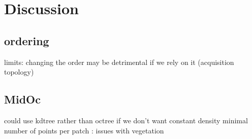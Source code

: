 

 \section{Discussion}
 
 \subsection{ordering}
 	limits: changing the order may be detrimental if we rely on it (acquisition topology)
 	
 \subsection{MidOc}
 	could use kdtree rather than octree if we don't want constant density
  	minimal number of points per patch : issues with vegetation
  	